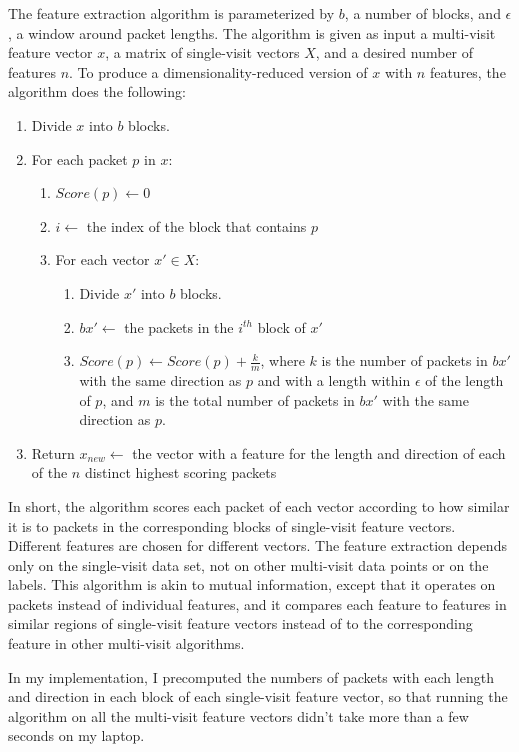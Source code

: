 \documentclass[10pt, twocolumn]{article}
\begin{document}
The feature extraction algorithm is parameterized by $b$, a number of blocks, and $\epsilon$, a window around packet lengths.
The algorithm is given as input a multi-visit feature vector $x$, a matrix of single-visit vectors $X$, and a desired number of 
features $n$. To produce a dimensionality-reduced version of $x$ with $n$ features, the algorithm does the following:
\begin{enumerate}
\item Divide $x$ into $b$ blocks.
\item For each packet $p$ in $x$:
\begin{enumerate}
\item $Score(p) \leftarrow 0$
\item $i \leftarrow $ the index of the block that contains $p$
\item For each vector $x' \in X$:
\begin{enumerate}
\item Divide $x'$ into $b$ blocks.
\item $bx' \leftarrow $ the packets in the $i^{th}$ block of $x'$
\item $Score(p) \leftarrow Score(p) + \frac{k}{m}$, where $k$ is the number of packets in $bx'$ with the same direction as $p$ and with a length within $\epsilon$ of the length of $p$, and $m$ is the total number of packets in $bx'$ with the same direction as $p$.
\end{enumerate}
\end{enumerate}
\item Return $x_{new} \leftarrow $ the vector with a feature for the length and direction of each of the $n$ distinct highest scoring packets
\end{enumerate}

In short, the algorithm scores each packet of each vector according to how similar it is to packets in the corresponding blocks of
single-visit feature vectors. Different features are chosen for different vectors. The feature extraction depends only on the 
single-visit data set, not on other multi-visit data points or on the labels. This algorithm is akin to mutual information, except 
that it operates on packets instead of individual features, and it compares each feature to features in similar regions of 
single-visit feature vectors instead of to the corresponding feature in other multi-visit algorithms.

In my implementation, I precomputed the numbers of packets with each length and direction in each block of each single-visit 
feature vector, so that running the algorithm on all the multi-visit feature vectors didn't take more than a few seconds on my 
laptop.
\end{document}
